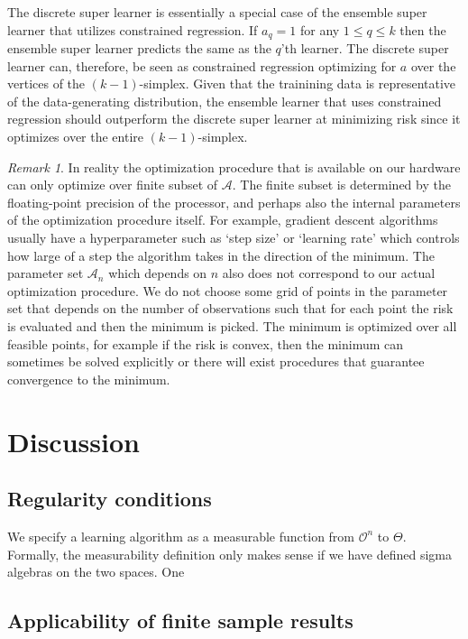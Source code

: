 \documentclass[11pt, a4paper]{article}
\theoremstyle{definition}
\theoremstyle{remark}
\newtheorem*{remark}{Remark}
\newcommand{\q}{q}
\newcommand{\ml}{k}
\begin{document}
The discrete super learner is essentially a special case of the ensemble super learner that utilizes constrained regression. If $ a_\q = 1 $ for any $ 1 \leq \q \leq k $ then the ensemble super learner predicts the same as the $ \q $'th learner. The discrete super learner can, therefore, be seen as constrained regression optimizing for $ a $ over the vertices of the $ (\ml -1) $-simplex. Given that the trainining data is representative of the data-generating distribution, the ensemble learner that uses constrained regression should outperform the discrete super learner at minimizing risk since it optimizes over the entire $ (\ml -1) $-simplex.  

\begin{remark}
In reality the optimization procedure that is available on our hardware can only optimize over finite subset of $ \mathcal{A} $. The finite subset is determined by the floating-point precision of the processor, and perhaps also the internal parameters of the optimization procedure itself. For example, gradient descent algorithms usually have a hyperparameter such as `step size' or `learning rate' which controls how large of a step the algorithm takes in the direction of the minimum. The parameter set $ \mathcal{A}_n $ which depends on $ n $ also does not correspond to our actual optimization procedure. We do not choose some grid of points in the parameter set that depends on the number of observations such that for each point the risk is evaluated and then the minimum is picked. The minimum is optimized over all feasible points, for example if the risk is convex, then the minimum can sometimes be solved explicitly or there will exist procedures that guarantee convergence to the minimum. 
\end{remark}


\section{Discussion}

\subsection{Regularity conditions} 
We specify a learning algorithm as a measurable function from $ \mathcal{O}^{n} $ to $ \Theta $. Formally, the measurability definition only makes sense if we have defined sigma algebras on the two spaces. One  

\subsection{Applicability of finite sample results}
\end{document}
